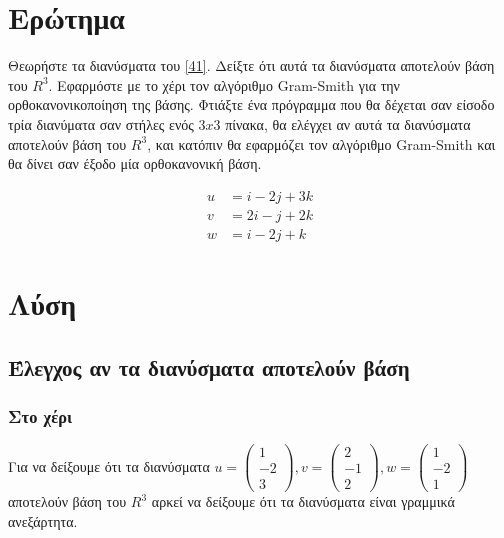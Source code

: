 \documentclass[12pt, fleqn, leqno]{extreport}
\begin{document}
\section{Ερώτημα}

Θεωρήστε τα διανύσματα του \eqref{41}. Δείξτε ότι αυτά τα διανύσματα αποτελούν βάση του $R^{3}$. Εφαρμόστε με το χέρι τον αλγόριθμο Gram-Smith για την ορθοκανονικοποίηση της βάσης. Φτιάξτε ένα πρόγραμμα που θα δέχεται σαν είσοδο τρία διανύματα σαν στήλες ενός $3x3$ πίνακα, θα ελέγχει αν αυτά τα διανύσματα αποτελούν βάση του $R^{3}$, και κατόπιν θα εφαρμόζει τον αλγόριθμο Gram-Smith και θα δίνει σαν έξοδο μία ορθοκανονική βάση.

\begin{equation}
    \begin{aligned}
        u & = i - 2j + 3k \\
        v & = 2i - j + 2k \\
        w & = i - 2j + k
    \end{aligned}\label{41}
\end{equation}

\newpage
\section{Λύση}
\subsection{Έλεγχος αν τα διανύσματα αποτελούν βάση}
\subsubsection{Στο χέρι}

Για να δείξουμε ότι τα διανύσματα
$
    u = \begin{pmatrix}
        1 \\ -2 \\ 3
    \end{pmatrix},
    v = \begin{pmatrix}
        2 \\ -1 \\ 2
    \end{pmatrix},
    w = \begin{pmatrix}
        1 \\ -2 \\ 1
    \end{pmatrix}
$
αποτελούν βάση του $R^{3}$ αρκεί να δείξουμε ότι τα διανύσματα είναι γραμμικά ανεξάρτητα.
\end{document}
